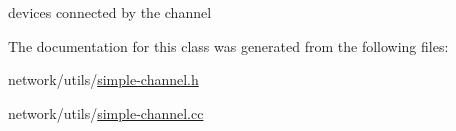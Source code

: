 devices connected by the channel 



The documentation for this class was generated from the following files\+:\begin{DoxyCompactItemize}
\item 
network/utils/\hyperlink{simple-channel_8h}{simple-\/channel.\+h}\item 
network/utils/\hyperlink{simple-channel_8cc}{simple-\/channel.\+cc}\end{DoxyCompactItemize}
